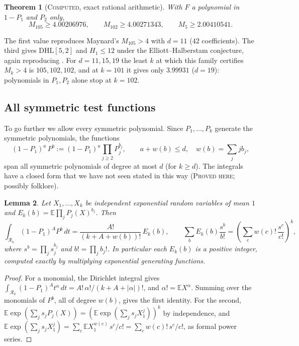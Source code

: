 \documentclass[11pt]{amsart}
\newtheorem{theorem}{Theorem}
\newtheorem{lemma}[theorem]{Lemma}
\theoremstyle{definition}
\theoremstyle{remark}
\newcommand{\lbl}[1]{\textup{\textsc{#1}}}
\newcommand{\DHL}{\mathrm{DHL}}
\newcommand{\R}{\mathcal{R}}
\begin{document}
\begin{theorem}[\lbl{Computed}, exact rational arithmetic]\label{thm:Mk0}
With $F$ a polynomial in $1-P_1$ and $P_2$ only,
\[
M_{105}\ge4.00206976,\qquad M_{102}\ge4.00271343,\qquad M_{5}\ge2.00410541 .
\]
\end{theorem}

The first value reproduces Maynard's $M_{105}>4$ with $d=11$ ($42$
coefficients). The third gives $\DHL[5,2]$ and $H_1\le12$ under the
Elliott--Halberstam conjecture, again reproducing \cite{May15}. For
$d=11,15,19$ the least $k$ at which this family certifies $M_k>4$ is
$105,102,102$, and at $k=101$ it gives only $3.99931$ ($d=19$): polynomials in
$P_1,P_2$ alone stop at $k=102$.

\subsection{All symmetric test functions}
To go further we allow every symmetric polynomial. Since $P_1,\dots,P_k$
generate the symmetric polynomials, the functions
\[
(1-P_1)^a\,P^{b}:=(1-P_1)^a\prod_{j\ge2}P_j^{b_j},\qquad a+w(b)\le d,\quad w(b)=\sum_j jb_j,
\]
span all symmetric polynomials of degree at most $d$ (for $k\ge d$). The
integrals have a closed form that we have not seen stated in this way
(\lbl{Proved here}; possibly folklore).

\begin{lemma}\label{lem:egf}
Let $X_1,\dots,X_k$ be independent exponential random variables of mean $1$
and $E_k(b)=\mathbb E\prod_jP_j(X)^{b_j}$. Then
\[
\int_{\R_k}(1-P_1)^AP^{b}\,dt=\frac{A!}{(k+A+w(b))!}\,E_k(b),
\qquad
\sum_b E_k(b)\frac{s^b}{b!}=\left(\sum_{c}w(c)!\,\frac{s^c}{c!}\right)^{k},
\]
where $s^b=\prod_js_j^{b_j}$ and $b!=\prod_jb_j!$. In particular each
$E_k(b)$ is a positive integer, computed exactly by multiplying
exponential generating functions.
\end{lemma}

\begin{proof}
For a monomial, the Dirichlet integral gives
$\int_{\R_k}(1-P_1)^At^\alpha\,dt=A!\,\alpha!/(k+A+|\alpha|)!$, and
$\alpha!=\mathbb EX^\alpha$. Summing over the monomials of $P^b$, all of
degree $w(b)$, gives the first identity. For the second,
$\mathbb E\exp(\sum_js_jP_j(X))=\left(\mathbb E\exp(\sum_js_jX_1^j)\right)^k$
by independence, and
$\mathbb E\exp(\sum_js_jX_1^j)=\sum_c\mathbb E X_1^{w(c)}\,s^c/c!=\sum_cw(c)!\,s^c/c!$,
as formal power series.
\end{proof}
\end{document}
